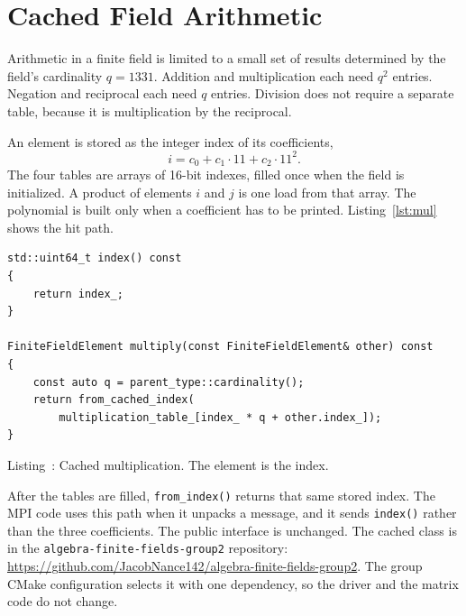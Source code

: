 \section{Cached Field Arithmetic}
\label{sec:cache}

Arithmetic in a finite field is limited to a small set of results determined by the field's cardinality \(q = 1331\).
Addition and multiplication each need \(q^2\) entries.
Negation and reciprocal each need \(q\) entries.
Division does not require a separate table, because it is multiplication by the reciprocal.

An element is stored as the integer index of its coefficients,
\[
i = c_0 + c_1 \cdot 11 + c_2 \cdot 11^2.
\]
The four tables are arrays of 16-bit indexes, filled once when the field is initialized.
A product of elements \(i\) and \(j\) is one load from that array.
The polynomial is built only when a coefficient has to be printed.
Listing~\ref{lst:mul} shows the hit path.

\noindent\begin{minipage}{\linewidth}
\label{lst:mul}
\begin{lstlisting}[style=cpp]
std::uint64_t index() const
{
    return index_;
}

FiniteFieldElement multiply(const FiniteFieldElement& other) const
{
    const auto q = parent_type::cardinality();
    return from_cached_index(
        multiplication_table_[index_ * q + other.index_]);
}
\end{lstlisting}
{\raggedright\footnotesize Listing~\thelstlisting: Cached multiplication. The element is the index.\par}
\end{minipage}
\FloatBarrier

After the tables are filled, \texttt{from\_index()} returns that same stored index.
The MPI code uses this path when it unpacks a message, and it sends \texttt{index()} rather than the three coefficients.
The public interface is unchanged.
The cached class is in the
\texttt{algebra-finite-fields-group2} repository:
\url{https://github.com/JacobNance142/algebra-finite-fields-group2}.
The group CMake configuration selects it with one dependency, so the driver and the matrix code do not change.
